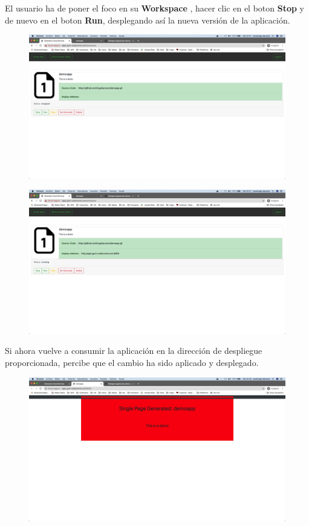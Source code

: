 \documentclass[a4paper,11pt]{book}
\begin{document}
 El usuario ha de poner el foco en su \textbf{Workspace} , hacer clic en el boton \textbf{Stop} y de nuevo en el boton \textbf{Run}, desplegando así la nueva versión de la aplicación. 
 
   \begin{figure}[H]
\centering
\includegraphics[scale=0.2]{imagenes/casouso/2_10.png}
\caption{   }
\end{figure}
 
 
   \begin{figure}[H]
\centering
\includegraphics[scale=0.2]{imagenes/casouso/2_11.png}
\caption{   }
\end{figure}
 
 Si ahora vuelve a consumir la aplicación en la dirección de despliegue proporcionada, percibe que el cambio ha sido aplicado y desplegado. 
 
 
   \begin{figure}[H]
\centering
\includegraphics[scale=0.2]{imagenes/casouso/2_12.png}
\caption{   }
\end{figure}
\end{document}
